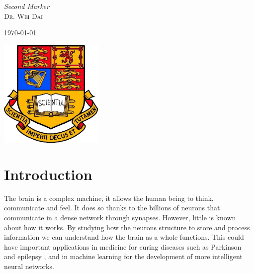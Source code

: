 \documentclass[11pt]{article}
\begin{document}
\begin{titlepage}
	\vfill
	
	{\large\textit{Second Marker}}\\
	\textsc{Dr. Wei Dai} 
	\vfill\vfill\vfill %
	
	{\large\today} %
	
	
	\vfill\vfill
	 
	\includegraphics[width=5cm]{imperialcollegelondon.jpg}\\[1cm] %
	
	\vfill %
	
\end{titlepage}

\begin{titlepage}
\tableofcontents
\end{titlepage}

\section{Introduction}

The brain is a complex machine, it allows the human being to think, communicate and feel. It does so thanks to the billions of neurons that communicate in a dense network through synapses. However, little is known about how it works. By studying how the neurons structure to store and process information we can understand how the brain as a whole functions. This could have important applications in medicine for curing diseases such as Parkinson \cite{OldeDubbelinkKimT.E.2014Dbnt} and epilepsy \cite{PONTEN2007918}, and in machine learning for the development of more intelligent neural networks.
\end{document}
